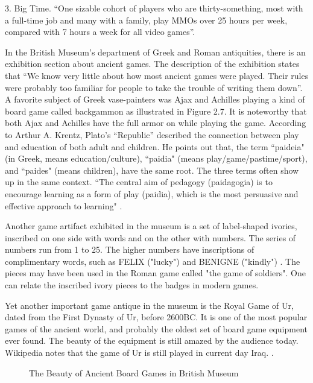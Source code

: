 3. Big Time. ``One sizable cohort of players who are thirty-something, most with a full-time job and many with a family, play MMOs over 25 hours per week, compared with 7 hours  a week for all video games''.

In the British Museum's department of Greek and Roman antiquities, there is an exhibition section about ancient games. The description of the exhibition states that ``We know very little about how most ancient games were played. Their rules were probably too familiar for people to take the trouble of writing them down''.  A favorite subject of Greek vase-painters was Ajax and Achilles playing a kind of board game called backgammon as illustrated in Figure 2.7. It is noteworthy that both Ajax and Achilles have the full armor on while playing the game. According to Arthur A. Krentz, Plato's ``Republic'' described the connection between play and education of both adult and children. He points out that, the term ``paideia" (in Greek, means education/culture), ``paidia" (means play/game/pastime/sport), and ``paides" (means children), have the same root. The three terms often show up in the same context. ``The central aim of pedagogy (paidagogia) is to encourage learning as a form of play (paidia), which is the most persuasive and effective approach to learning" \cite{krentz1998play}.

Another game artifact exhibited in the museum is a set of label-shaped ivories, inscribed on one side with words and on the other with numbers. The series of numbers run from 1 to 25. The higher numbers have inscriptions of complimentary words, such as FELIX ("lucky") and BENIGNE ("kindly") \cite{walters1929guide}. The pieces may have been used in the Roman game called "the game of soldiers". One can relate the inscribed ivory pieces to the badges in modern games.

Yet another important game antique in the museum is the Royal Game of Ur, dated from the First Dynasty of Ur, before 2600BC. It is one of the most popular games of the ancient world, and probably the oldest set of board game equipment ever found. The beauty of the equipment is still amazed by the audience today.  Wikipedia notes that the game of Ur is still played in current day Iraq. \cite {wikipediaUr}.

\begin{figure}[htbp]
	\centering
		\caption{The Beauty of Ancient Board Games in British Museum}
		\label{fig:ancient-board-games}
\end{figure}

